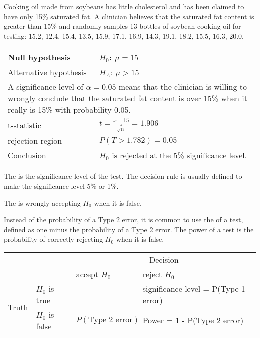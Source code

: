 \begin{example}
    Cooking oil made from soybeans has little cholesterol and has been claimed to have only 15\% saturated fat. A clinician believes that the saturated fat content is greater than 15\% and randomly samples 13 bottles of soybean cooking oil for testing: 15.2, 12.4, 15.4, 13.5, 15.9, 17.1, 16.9, 14.3, 19.1, 18.2, 15.5, 16.3, 20.0.
    \begin{center}
        \begin{tabular}{p{4cm}|p{7cm}}
        Null hypothesis & $H_0$: $\mu=15$ \\
        \hline
        Alternative hypothesis & $H_A$: $\mu > 15$ \\
        \hline
        \multicolumn{2}{p{11cm}}{A significance level of $\alpha=0.05$ means that the clinician is willing to wrongly conclude that the saturated fat content is over 15\% when it really is 15\% with probability 0.05.} \\
        \hline
        t-statistic & $t=\frac{\bar{x}-15}{\frac{s}{\sqrt{13}}} = 1.906$ \\
        \hline
        rejection region & $P(T>1.782) = 0.05$ \\
        \hline
        Conclusion & $H_0$ is rejected at the 5\% significance level.
    \end{tabular}
    \end{center}
\end{example}

\begin{definition}
    The  is the significance level of the test. The decision rule is usually defined to make the significance level 5\% or 1\%.
    
    The  is wrongly accepting $H_0$ when it is false.
\end{definition}

Instead of the probability of a Type 2 error, it is common to use the  of a test, defined as one minus the probability of a Type 2 error. The power of a test is the probability of correctly rejecting $H_0$ when it is false.
\begin{center}
    \begin{tabular}{p{2cm}p{2cm}|p{3cm}|p{3cm}}
     & & \multicolumn{2}{|c}{Decision} \\
     \cline{3-4}
     & & accept $H_0$ & reject $H_0$ \\
     \hline
     \multirow{3}{*}{Truth} & \multicolumn{1}{|l|}{$H_0$ is true} & \cellcolor{green} & \cellcolor{red}significance level = P(Type 1 error) \\
     \cline{2-4}
     & \multicolumn{1}{|l|}{$H_0$ is false} & \cellcolor{red}$P(\text{Type 2 error})$ & \cellcolor{green}Power = 1 - P(Type 2 error) \\
\end{tabular}
\end{center}

